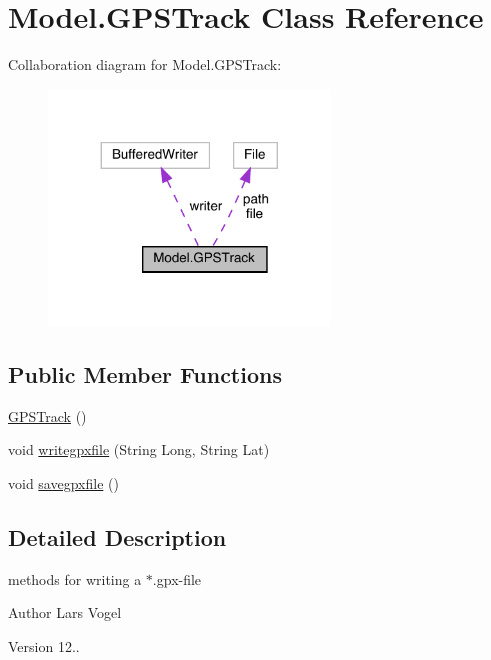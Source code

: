 \hypertarget{class_model_1_1_g_p_s_track}{}\section{Model.\+G\+P\+S\+Track Class Reference}
\label{class_model_1_1_g_p_s_track}


Collaboration diagram for Model.\+G\+P\+S\+Track\+:
\nopagebreak
\begin{figure}[H]
\begin{center}
\leavevmode
\includegraphics[width=212pt]{class_model_1_1_g_p_s_track__coll__graph}
\end{center}
\end{figure}
\subsection*{Public Member Functions}
\begin{DoxyCompactItemize}
\item 
\hyperlink{class_model_1_1_g_p_s_track_a707efff3d6af362311d7d50be56fcada}{G\+P\+S\+Track} ()
\item 
void \hyperlink{class_model_1_1_g_p_s_track_a2edd8ce93c7e308c767b57f95fd8bb44}{writegpxfile} (String Long, String Lat)
\item 
void \hyperlink{class_model_1_1_g_p_s_track_a6e20856dcc9e383b7251cca5d65ab4ad}{savegpxfile} ()
\end{DoxyCompactItemize}


\subsection{Detailed Description}
methods for writing a $\ast$.gpx-\/file \begin{DoxyAuthor}{Author}
Lars Vogel 
\end{DoxyAuthor}
\begin{DoxyVersion}{Version}
12.. 
\end{DoxyVersion}


